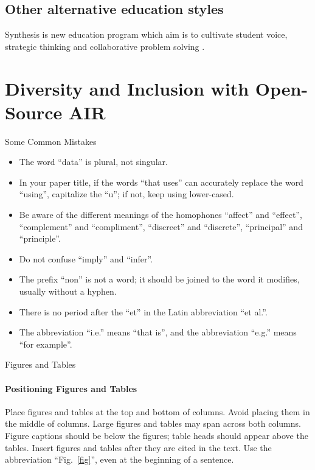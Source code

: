 \documentclass[conference]{IEEEtran}
\begin{document}
\subsection{Other alternative education styles}

Synthesis is new education program which aim is to cultivate student voice, strategic thinking and collaborative problem solving \cite{synthesis2022}.



\section{Diversity and Inclusion with Open-Source AIR}

Some Common Mistakes
\begin{itemize}
\item The word ``data'' is plural, not singular.
\item In your paper title, if the words ``that uses'' can accurately replace the word ``using'', capitalize the ``u''; if not, keep using lower-cased.
\item Be aware of the different meanings of the homophones ``affect'' and ``effect'', ``complement'' and ``compliment'', ``discreet'' and ``discrete'', ``principal'' and ``principle''.
\item Do not confuse ``imply'' and ``infer''.
\item The prefix ``non'' is not a word; it should be joined to the word it modifies, usually without a hyphen.
\item There is no period after the ``et'' in the Latin abbreviation ``et al.''.
\item The abbreviation ``i.e.'' means ``that is'', and the abbreviation ``e.g.'' means ``for example''.
\end{itemize}

Figures and Tables
\paragraph{Positioning Figures and Tables} Place figures and tables at the top and 
bottom of columns. Avoid placing them in the middle of columns. Large 
figures and tables may span across both columns. Figure captions should be 
below the figures; table heads should appear above the tables. Insert 
figures and tables after they are cited in the text. Use the abbreviation 
``Fig.~\ref{fig}'', even at the beginning of a sentence.
\end{document}

